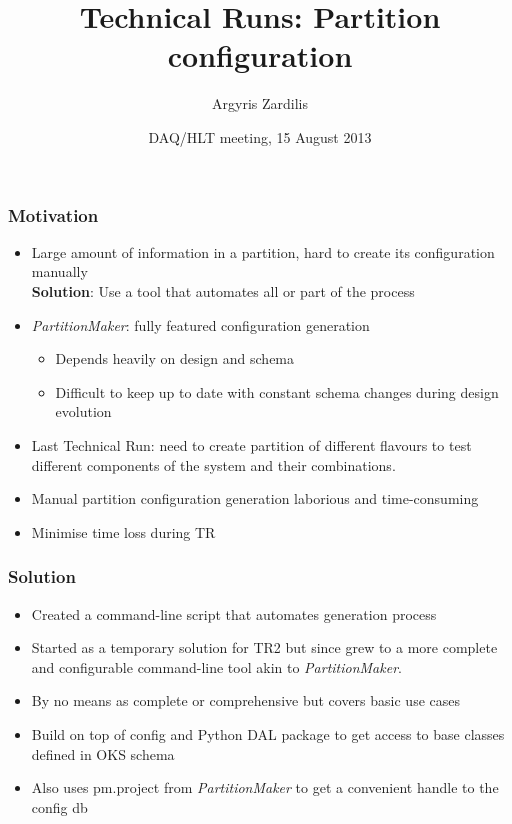 \documentclass{beamer}
\title
{Technical Runs: Partition configuration}
\author[Argyris Zardilis]
{Argyris Zardilis \inst{}}
\institute[Uni Cambridge \& CERN]
{
  \inst{}
  University of Cambridge \& CERN
}
\date[DAQ/HLT meeting, 15/08/2013]
{DAQ/HLT meeting, 15 August 2013}
\begin{document}
\frame{\titlepage}

\begin{frame}
  \frametitle{Motivation}
  \begin{itemize}
    \item Large amount of information in a partition, hard to create its configuration manually \\
      \textbf{Solution}: Use a tool that automates all or part of the process

    \item \textit{PartitionMaker}: fully featured configuration generation
      \begin{itemize}
        \item Depends heavily on design and schema
        

        \item Difficult to keep up to date with constant schema changes during design evolution
      \end{itemize}


    \item Last Technical Run: need to create partition of different flavours to test different components
      of the system and their combinations.

    \item Manual partition configuration generation laborious and time-consuming

    \item Minimise time loss during TR
  \end{itemize}
  
\end{frame}


\begin{frame}
  \frametitle{Solution}
  \begin{itemize}
    \item Created a command-line script that automates generation process

    \item Started as a temporary solution for TR2 but since grew to a more complete
      and configurable command-line tool akin to \textit{PartitionMaker}.

    \item By no means as complete or comprehensive but covers basic use cases

    \item Build on top of config and Python DAL package to get access to base classes defined in OKS schema 

    \item Also uses pm.project from \textit{PartitionMaker} to get a convenient handle to the config db

  \end{itemize}
\end{frame}
\end{document}
